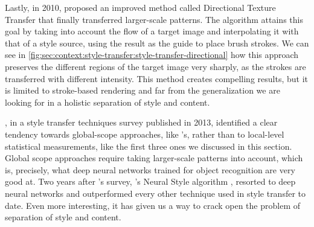 Lastly, in 2010, \citet{Lee2010} proposed an improved method called Directional Texture Transfer that finally transferred larger-scale patterns.
The algorithm attains this goal by taking into account the flow of a target image and interpolating it with that of a style source, using the result as the guide to place brush strokes.
We can see in \autoref{fig:sec:context:style-transfer:style-transfer-directional} how this approach preserves the different regions of the target image very sharply, as the strokes are transferred with different intensity.
This method creates compelling results, but it is limited to stroke-based rendering and far from the generalization we are looking for in a holistic separation of style and content.

\citeauthor{Kyprianidis2013}, in a style transfer techniques survey \cite{Kyprianidis2013} published in 2013, identified a clear tendency towards global-scope approaches, like \citeauthor{Lee2010}'s, rather than to local-level statistical measurements, like the first three ones we discussed in this section.
Global scope approaches require taking larger-scale patterns into account, which is, precisely, what deep neural networks trained for object recognition are very good at.
Two years after \citeauthor{Kyprianidis2013}'s survey, \citeauthor{Gatys2015B}'s Neural Style algorithm \cite{Gatys2015B}, resorted to deep neural networks and outperformed every other technique used in style transfer to date.
Even more interesting, it has given us a way to crack open the problem of separation of style and content.
